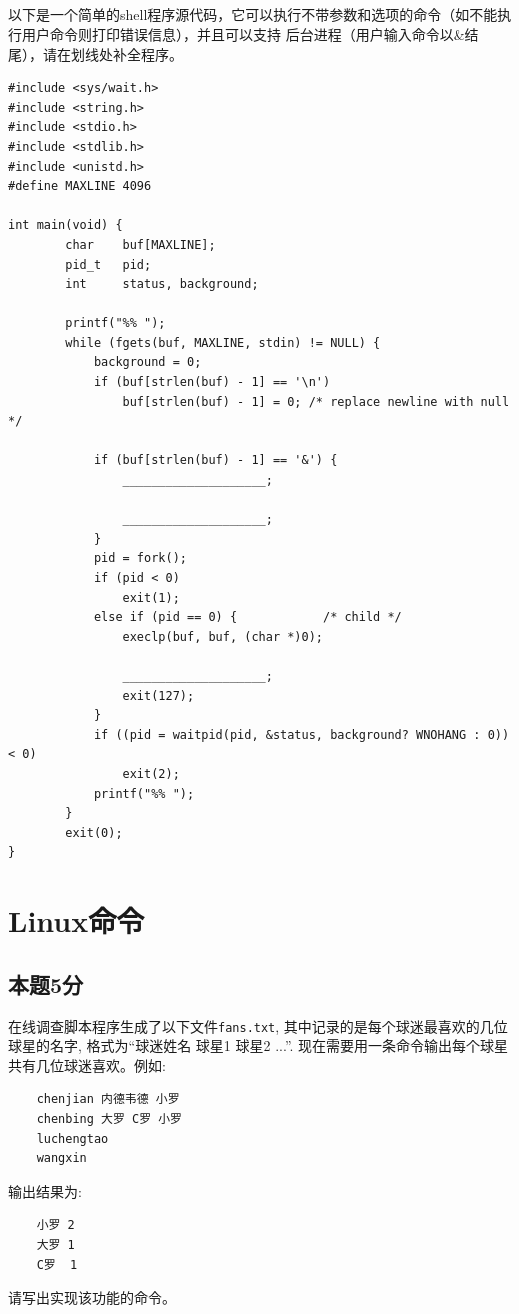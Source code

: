 \documentclass[a4paper,11pt]{article}
\begin{document}
\begin{CJK*}{UTF8}{gbsn}
\subsection{}
以下是一个简单的shell程序源代码，它可以执行不带参数和选项的命令（如不能执行用户命令则打印错误信息），并且可以支持
后台进程（用户输入命令以\&结尾），请在划线处补全程序。
\begin{verbatim}
#include <sys/wait.h>
#include <string.h>
#include <stdio.h>
#include <stdlib.h>
#include <unistd.h>
#define MAXLINE 4096

int main(void) {
        char    buf[MAXLINE];   
        pid_t   pid;
        int     status, background;

        printf("%% ");  
        while (fgets(buf, MAXLINE, stdin) != NULL) {
            background = 0;
            if (buf[strlen(buf) - 1] == '\n')
                buf[strlen(buf) - 1] = 0; /* replace newline with null */

            if (buf[strlen(buf) - 1] == '&') {
                ____________________;

                ____________________;
            }
            pid = fork();
            if (pid < 0) 
                exit(1);
            else if (pid == 0) {            /* child */
                execlp(buf, buf, (char *)0);

                ____________________;
                exit(127);
            }
            if ((pid = waitpid(pid, &status, background? WNOHANG : 0)) < 0)
                exit(2);
            printf("%% ");
        }
        exit(0);
}
\end{verbatim}


\section{Linux命令}

\subsection{本题5分}
在线调查脚本程序生成了以下文件\verb|fans.txt|, 其中记录的是每个球迷最喜欢的几位球星的名字, 格式为``球迷姓名 球星1 球星2 ...''.
现在需要用一条命令输出每个球星共有几位球迷喜欢。例如:
\begin{verbatim}
    chenjian 内德韦德 小罗
    chenbing 大罗 C罗 小罗
    luchengtao 
    wangxin 
\end{verbatim}
输出结果为:

\begin{verbatim}
    小罗 2
    大罗 1
    C罗  1
\end{verbatim}
请写出实现该功能的命令。
\\[1in]


\end{CJK*}
\end{document}
